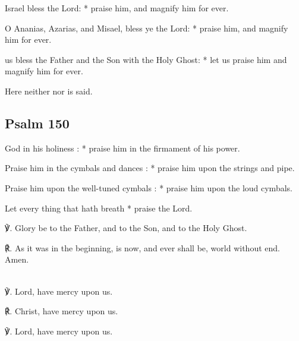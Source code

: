 \begin{multicols}{2}
 Israel bless the Lord: * praise him, and magnify him for ever.\par
{}
O Ananias, Azarias, and Misael, bless ye the Lord: * praise him, and magnify him for ever.

     us bless the Father and the Son with the Holy Ghost: * let us praise him and magnify him for ever.\par

\begin{rubric}
	Here neither  nor  is said.
\end{rubric}

\subsection{Psalm 150}

 God in his holiness : * praise him in the firmament of his power.\par
{}
Praise him in the cymbals and dances : * praise him upon the strings and pipe.\par
{}Praise him upon the well-tuned cymbals : * praise him upon the loud cymbals.\par
{}Let every thing that hath breath * praise the Lord.\par
℣. Glory be to the Father, and to the Son, and to the Holy Ghost.\par
℟. As it was in the beginning, is now, and ever shall be, world without end. Amen.

\\

℣. Lord, have mercy upon us.

℟. Christ, have mercy upon us.

℣. Lord, have mercy upon us.


\end{multicols}
